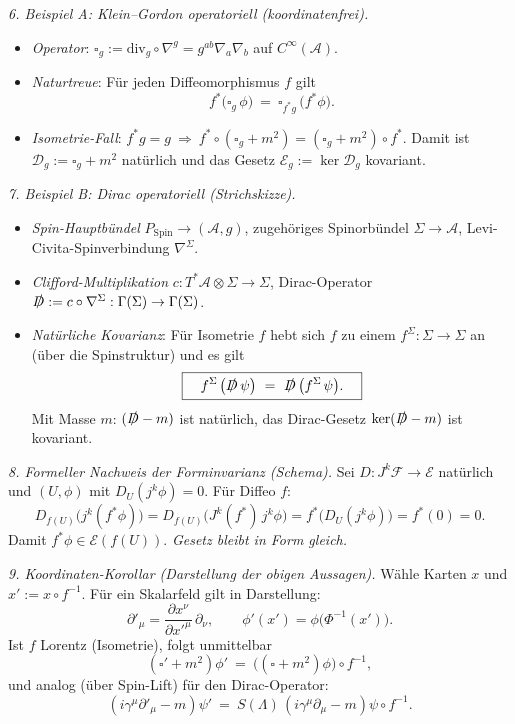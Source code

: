 \documentclass[10pt, letterpaper]{article}
\begin{document}
\bigskip
\emph{6. Beispiel A: Klein–Gordon operatoriell (koordinatenfrei).}
\begin{itemize}
\item \emph{Operator}: $\square_g:=\mathrm{div}_g\circ\nabla^g = g^{ab}\nabla_a\nabla_b$ auf $C^\infty(\mathcal A)$.
\item \emph{Naturtreue}: Für jeden Diffeomorphismus $f$ gilt
\[
\boxed{\quad f^*\big(\square_g\,\phi\big)\ =\ \square_{f^*g}\,\big(f^*\phi\big). \quad}
\]
\item \emph{Isometrie-Fall}: $f^*g=g \ \Rightarrow\  f^*\circ(\square_g+m^2)=(\square_g+m^2)\circ f^*$.
Damit ist $\mathcal D_g:=\square_g+m^2$ natürlich und das Gesetz
$\mathcal E_g:=\ker\mathcal D_g$ kovariant.
\end{itemize}

\bigskip
\emph{7. Beispiel B: Dirac operatoriell (Strichskizze).}
\begin{itemize}
\item \emph{Spin-Hauptbündel} $P_{\mathrm{Spin}}\to(\mathcal A,g)$, zugehöriges Spinorbündel
$\Sigma\to\mathcal A$, Levi-Civita-Spinverbindung $\nabla^\Sigma$.
\item \emph{Clifford-Multiplikation} $c:T^*\mathcal A\otimes\Sigma\to\Sigma$,
Dirac-Operator $\slashed{D}:=c\circ\nabla^\Sigma:\Gamma(\Sigma)\to\Gamma(\Sigma)$.
\item \emph{Natürliche Kovarianz}: Für Isometrie $f$ hebt sich $f$ zu einem
$f^\Sigma:\Sigma\to\Sigma$ an (über die Spinstruktur) und es gilt
\[
\boxed{\quad f^{\Sigma\,\*}\big(\slashed{D}\,\psi\big)\ =\ \slashed{D}\,\big(f^{\Sigma\,\*}\psi\big). \quad}
\]
Mit Masse $m$: $(\slashed{D}-m)$ ist natürlich, das Dirac-Gesetz $\ker(\slashed{D}-m)$ ist kovariant.
\end{itemize}

\bigskip
\emph{8. Formeller Nachweis der Forminvarianz (Schema).}
Sei $D:J^k\mathcal F\to\mathcal E$ natürlich und $(U,\phi)$ mit $D_U(j^k\phi)=0$. Für Diffeo $f$:
\[
D_{f(U)}\big(j^k(f^*\phi)\big)
= D_{f(U)}\big(J^k(f^*)\,j^k\phi\big)
= f^*\big(D_U(j^k\phi)\big)
= f^*(0)=0.
\]
Damit $f^*\phi\in\mathcal E(f(U))$. \emph{Gesetz bleibt in Form gleich.}

\bigskip
\emph{9. Koordinaten-Korollar (Darstellung der obigen Aussagen).}
Wähle Karten $x$ und $x':=x\circ f^{-1}$. Für ein Skalarfeld gilt in Darstellung:
\[
\partial'_\mu = \frac{\partial x^\nu}{\partial x'^\mu}\,\partial_\nu,\qquad
\phi'(x')=\phi\big(\Phi^{-1}(x')\big).
\]
Ist $f$ Lorentz (Isometrie), folgt unmittelbar
\[
(\square'+m^2)\phi' \ =\ \big((\square+m^2)\phi\big)\circ f^{-1},
\]
und analog (über Spin-Lift) für den Dirac-Operator:
\[
(i\gamma^\mu\partial'_\mu - m)\psi' \ =\ S(\Lambda)\,(i\gamma^\mu\partial_\mu - m)\psi\circ f^{-1}.
\]
\end{document}

